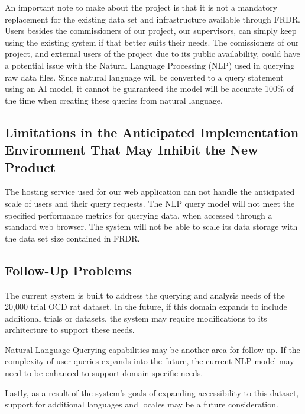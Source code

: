 \documentclass[12pt]{article}
\begin{document}
\par{An important note to make about the project is that it is not a mandatory replacement for the existing data set and infrastructure 
available through FRDR. Users besides the commissioners of our project, our supervisors, can simply keep using the existing system 
if that better suits their needs. \newline \indent The comissioners of our project, and external users of the project due to its public 
availability, could have a potential issue with the Natural Language Processing (NLP) used in querying raw data files. Since natural language 
will be converted to a query statement using an AI model, it cannot be guaranteed the model will be accurate 100\% of the time when 
creating these queries from natural language.}

\subsection{Limitations in the Anticipated Implementation Environment That May
Inhibit the New Product}

\par{The hosting service used for our web application can not handle the anticipated scale of users and their query requests. \newline \indent
The NLP query model will not meet the specified performance metrics for querying data, when accessed through a standard web browser. \newline \indent
The system will not be able to scale its data storage with the data set size contained in FRDR.}

\subsection{Follow-Up Problems}

\par{The current system is built to address the querying and analysis needs of the 20,000 trial OCD rat dataset. In the future, if this domain expands to include additional trials or datasets, the system may require modifications to its architecture to support these needs. }
\par{ Natural Language Querying capabilities may be another area for follow-up. If the complexity of user queries expands into the future, the current NLP model may need to be enhanced to support domain-specific needs.  }
\par{Lastly, as a result of the system's goals of expanding accessibility to this dataset, support for additional languages and locales may be a future consideration. }
\end{document}
